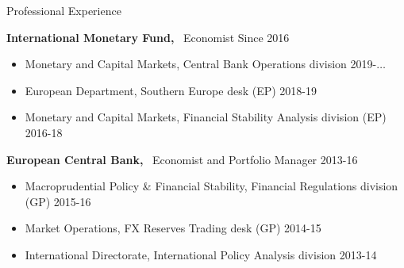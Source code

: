 \documentclass[usegeometry, 10pt, a4paper]{cv} %
\newcommand{\activite}[1]{\textbf{#1}\ }
\begin{document}
\begin{rubriquetableau}[0.95\textwidth]{Professional Experience}\\
\vspace{-0.3cm}

\activite{International Monetary Fund,} Economist \hfill Since 2016 \\

\begin{itemize}[label={}]

  
\item Monetary and Capital Markets, Central Bank Operations division \hfill 2019-$\dots$
  
\item European Department, Southern Europe desk (EP) \hfill 2018-19
  
\item Monetary and Capital Markets, Financial Stability Analysis division (EP) \hfill 2016-18
\end{itemize}

\vspace{0.5cm}

\activite{European Central Bank,} Economist and Portfolio Manager \hfill 2013-16 \\

\begin{itemize}[label={}]  
\item Macroprudential Policy \& Financial Stability, Financial
  Regulations division (GP) \hfill 2015-16
  
\item Market Operations, FX Reserves Trading desk (GP) \hfill 2014-15
  
\item International Directorate, International Policy Analysis division \hfill 2013-14
\end{itemize}
\end{rubriquetableau}
\end{document}

